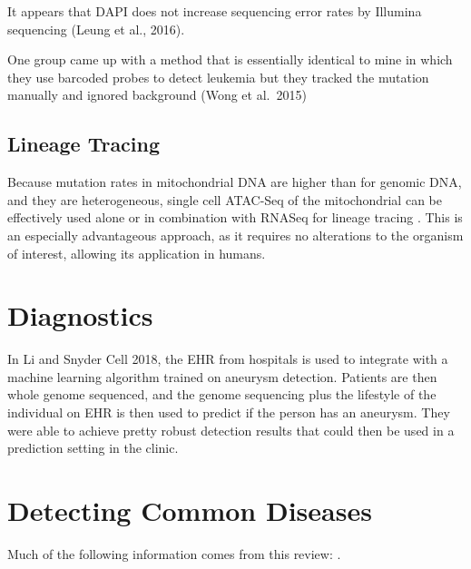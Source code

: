 \documentclass[]{book}
\begin{document}
It appears that DAPI does not increase sequencing error rates by Illumina sequencing (Leung et al., 2016).

One group came up with a method that is essentially identical to mine in which they use barcoded probes to detect leukemia but they tracked the mutation manually and ignored background (Wong et al.~2015)

\hypertarget{lineage-tracing}{%
\subsection{Lineage Tracing}\label{lineage-tracing}}

Because mutation rates in mitochondrial DNA are higher than for genomic DNA, and they are heterogeneous, single cell ATAC-Seq of the mitochondrial can be effectively used alone or in combination with RNASeq for lineage tracing \citep{ludwig2019lineage}. This is an especially advantageous approach, as it requires no alterations to the organism of interest, allowing its application in humans.

\hypertarget{diagnostics}{%
\section{Diagnostics}\label{diagnostics}}

In Li and Snyder Cell 2018, the EHR from hospitals is used to integrate with a machine learning algorithm trained on aneurysm detection. Patients are then whole genome sequenced, and the genome sequencing plus the lifestyle of the individual on EHR is then used to predict if the person has an aneurysm. They were able to achieve pretty robust detection results that could then be used in a prediction setting in the clinic.

\hypertarget{detecting-common-diseases}{%
\section{Detecting Common Diseases}\label{detecting-common-diseases}}

Much of the following information comes from this review: \citep{shendure2019genomic}.
\end{document}
